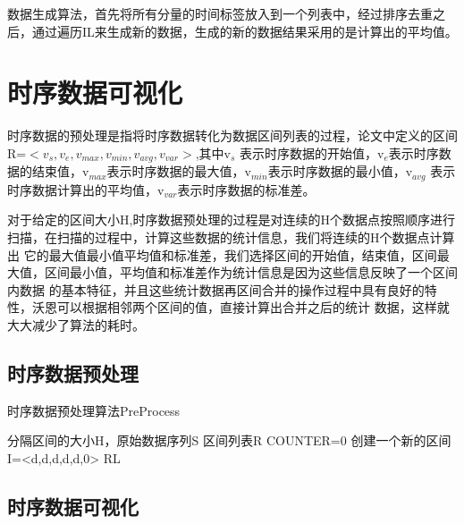 数据生成算法，首先将所有分量的时间标签放入到一个列表中，经过排序去重之后，通过遍历IL来生成新的数据，生成的新的数据结果采用的是计算出的平均值。


\section{时序数据可视化}
\label{section 4.2}

时序数据的预处理是指将时序数据转化为数据区间列表的过程，论文中定义的区间R=$<v_{s},v_{e},v_{max},v_{min},v_{avg},v_{var}>$,其中v$_{s}$
表示时序数据的开始值，v$_{e}$表示时序数据的结束值，v$_{max}$表示时序数据的最大值，v$_{min}$表示时序数据的最小值，v$_{avg}$
表示时序数据计算出的平均值，v$_{var}$表示时序数据的标准差。


对于给定的区间大小H,时序数据预处理的过程是对连续的H个数据点按照顺序进行扫描，在扫描的过程中，计算这些数据的统计信息，我们将连续的H个数据点计算出
它的最大值最小值平均值和标准差，我们选择区间的开始值，结束值，区间最大值，区间最小值，平均值和标准差作为统计信息是因为这些信息反映了一个区间内数据
的基本特征，并且这些统计数据再区间合并的操作过程中具有良好的特性，沃恩可以根据相邻两个区间的值，直接计算出合并之后的统计 
数据，这样就大大减少了算法的耗时。

\subsection{时序数据预处理}
\label{section 4.21}


\begin{algorithm}
\caption{时序数据预处理算法PreProcess}
\label{alg4}
\begin{algorithmic}[1]
\REQUIRE 分隔区间的大小H，原始数据序列S
\ENSURE 区间列表R
\STATE COUNTER=0
\STATE 创建一个新的区间 I=<d,d,d,d,d,0>
\STATE 
\ENDIF
\ENDFOR
\RETURN RL
\end{algorithmic}
\end{algorithm}


\subsection{时序数据可视化}
\label{section 4.22}

